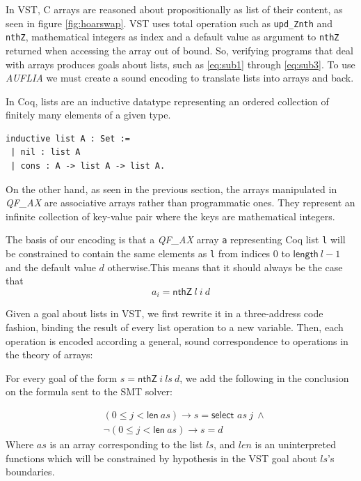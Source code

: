 \documentclass[onecolumn, preprint]{sigplanconf}
\begin{document}
In VST, C arrays are reasoned about propositionally as list of their content, as seen in figure \ref{fig:hoarswap}. VST uses total operation such as \texttt{upd\_Znth} and \texttt{nthZ}, mathematical integers as index and a default value as argument to \texttt{nthZ} returned when accessing the array out of bound. So, verifying programs that deal with arrays produces goals about lists, such as \ref{eq:sub1} through \ref{eq:sub3}. To use \emph{AUFLIA} we must create a sound encoding to translate lists into arrays and back. 

In Coq, lists are an inductive datatype representing an ordered collection of finitely many elements of a given type.
\begin{center}
\begin{lstlisting}
inductive list A : Set :=
 | nil : list A
 | cons : A -> list A -> list A.
\end{lstlisting}
\end{center}
On the other hand, as seen in the previous section, the arrays manipulated in \emph{QF\_AX} are associative arrays rather than programmatic ones. They represent an infinite collection of key-value pair where the keys are mathematical integers. 

The basis of our encoding is that a \emph{QF\_AX} array \texttt{a} representing Coq list \texttt{l} will be constrained to contain the same elements as \texttt{l} from indices $0$ to $\mathsf{length}\ l - 1$ and the default value $d$ otherwise.This means that it should always be the case that
$$ a_i = \textsf{nthZ}\ l\ i\ d$$

Given a goal about lists in VST, we first rewrite it in a three-address code fashion, binding the result of every list operation to a new variable. Then, each operation is encoded according a general, sound correspondence to operations in the theory of arrays:

For every goal of the form $s = \textsf{nthZ}\ i\ ls\ d$, we add the following in the conclusion on the formula sent to the SMT solver:

\begin{align*}
&(0 \leq j < \textsf{len}\ as) \to s = \textsf{select } as\ j\ \wedge \\
&\neg (0 \leq j < \textsf{len}\ as) \to s = d 
\end{align*}
Where $as$ is an array corresponding to the list $ls$, and $len$ is an uninterpreted functions which will be constrained by hypothesis in the VST goal about $ls$'s boundaries.
\end{document}
